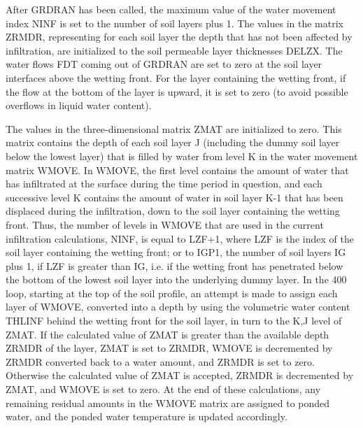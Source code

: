 After G\+R\+D\+R\+A\+N has been called, the maximum value of the water movement index N\+I\+N\+F is set to the number of soil layers plus 1. The values in the matrix Z\+R\+M\+D\+R, representing for each soil layer the depth that has not been affected by infiltration, are initialized to the soil permeable layer thicknesses D\+E\+L\+Z\+X. The water flows F\+D\+T coming out of G\+R\+D\+R\+A\+N are set to zero at the soil layer interfaces above the wetting front. For the layer containing the wetting front, if the flow at the bottom of the layer is upward, it is set to zero (to avoid possible overflows in liquid water content).

The values in the three-\/dimensional matrix Z\+M\+A\+T are initialized to zero. This matrix contains the depth of each soil layer J (including the dummy soil layer below the lowest layer) that is filled by water from level K in the water movement matrix W\+M\+O\+V\+E. In W\+M\+O\+V\+E, the first level contains the amount of water that has infiltrated at the surface during the time period in question, and each successive level K contains the amount of water in soil layer K-\/1 that has been displaced during the infiltration, down to the soil layer containing the wetting front. Thus, the number of levels in W\+M\+O\+V\+E that are used in the current infiltration calculations, N\+I\+N\+F, is equal to L\+Z\+F+1, where L\+Z\+F is the index of the soil layer containing the wetting front; or to I\+G\+P1, the number of soil layers I\+G plus 1, if L\+Z\+F is greater than I\+G, i.\+e. if the wetting front has penetrated below the bottom of the lowest soil layer into the underlying dummy layer. In the 400 loop, starting at the top of the soil profile, an attempt is made to assign each layer of W\+M\+O\+V\+E, converted into a depth by using the volumetric water content T\+H\+L\+I\+N\+F behind the wetting front for the soil layer, in turn to the K,J level of Z\+M\+A\+T. If the calculated value of Z\+M\+A\+T is greater than the available depth Z\+R\+M\+D\+R of the layer, Z\+M\+A\+T is set to Z\+R\+M\+D\+R, W\+M\+O\+V\+E is decremented by Z\+R\+M\+D\+R converted back to a water amount, and Z\+R\+M\+D\+R is set to zero. Otherwise the calculated value of Z\+M\+A\+T is accepted, Z\+R\+M\+D\+R is decremented by Z\+M\+A\+T, and W\+M\+O\+V\+E is set to zero. At the end of these calculations, any remaining residual amounts in the W\+M\+O\+V\+E matrix are assigned to ponded water, and the ponded water temperature is updated accordingly.

